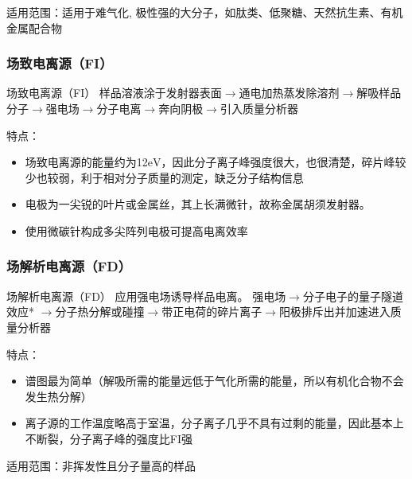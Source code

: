     适用范围：适用于难气化, 极性强的大分子，如肽类、低聚糖、天然抗生素、有机金属配合物    
    
    \subsubsection*{场致电离源（FI）}
   \begin{definition*}{场致电离源（FI）}
    样品溶液涂于发射器表面$\rightarrow$通电加热蒸发除溶剂$\rightarrow$解吸样品分子$\rightarrow$强电场$\rightarrow$分子电离$\rightarrow$奔向阴极$\rightarrow$引入质量分析器
   \end{definition*}
    特点：
    \begin{itemize}
        \item 场致电离源的能量约为12$\mathrm{eV}$，因此分子离子峰强度很大，也很清楚，碎片峰较少也较弱，利于相对分子质量的测定，缺乏分子结构信息
        \item 电极为一尖锐的叶片或金属丝，其上长满微针，故称金属胡须发射器。
        \item 使用微碳针构成多尖阵列电极可提高电离效率
    \end{itemize}

    \subsubsection*{场解析电离源（FD）}
    \begin{definition*}{场解析电离源（FD）}
        应用强电场诱导样品电离。
    强电场$\rightarrow$分子电子的量子隧道效应* $\rightarrow$分子热分解或碰撞$\rightarrow$带正电荷的碎片离子$\rightarrow$阳极排斥出并加速进入质量分析器
    \end{definition*}
   
    特点：
    \begin{itemize}
        \item 谱图最为简单（解吸所需的能量远低于气化所需的能量，所以有机化合物不会发生热分解）
        \item 离子源的工作温度略高于室温，分子离子几乎不具有过剩的能量，因此基本上不断裂，分子离子峰的强度比FI强
    \end{itemize}

    适用范围：非挥发性且分子量高的样品


